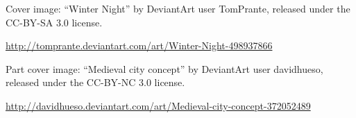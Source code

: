 \item Cover image: ``Winter Night'' by DeviantArt user TomPrante,
  released under the CC-BY-SA 3.0 license.

  \url{http://tomprante.deviantart.com/art/Winter-Night-498937866}

\item Part cover image: ``Medieval city concept'' by DeviantArt user davidhueso, released under the CC-BY-NC 3.0 license.

  \url{http://davidhueso.deviantart.com/art/Medieval-city-concept-372052489}
